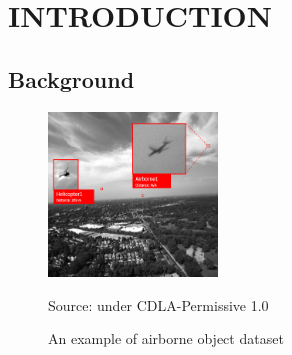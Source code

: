 \chapter{INTRODUCTION}
\section{Background}
\label{section:background}

    \begin{figure}[b!] 
        \centering
        \includegraphics[width=0.4\textwidth]{figures/dataset-example-labeled.png}
        \caption*{Source: \textcite{aot_dataset} under CDLA-Permissive 1.0}
        \caption{An example of airborne object dataset}
        \label{fig:airborne-object-example-1}
    \end{figure}
    \vspace{-2ex}


